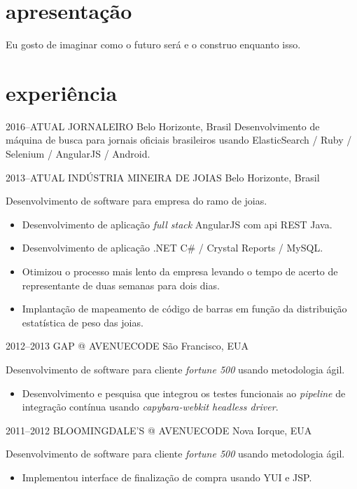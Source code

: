 \documentclass[]{friggeri-cv}
\begin{document}
\section{apresentação}
Eu gosto de imaginar como o futuro será e o construo enquanto isso.

\section{experiência}

\begin{entrylist}


\entry
{2016--ATUAL}
{JORNALEIRO}
{Belo Horizonte, Brasil}
{ Desenvolvimento de máquina de busca para jornais oficiais brasileiros usando ElasticSearch / Ruby / Selenium / AngularJS / Android.
}

\entry
{2013--ATUAL}
{INDÚSTRIA MINEIRA DE JOIAS}
{Belo Horizonte, Brasil}
{ Desenvolvimento de software para empresa do ramo de joias.

  \begin{itemize}
    \item Desenvolvimento de aplicação \textit{full stack} AngularJS com api REST Java.
    \item Desenvolvimento de aplicação .NET C\# / Crystal Reports / MySQL.
    \item Otimizou o processo mais lento da empresa levando o tempo de acerto de representante de duas semanas para dois dias.
    \item Implantação de mapeamento de código de barras em função da distribuição estatística de peso das joias.
  \end{itemize}
  }


\entry
{2012--2013}
{GAP @ AVENUECODE}
{São Francisco, EUA}
{ Desenvolvimento de software para cliente \textit{fortune 500} usando metodologia ágil.
  \begin{itemize}
    \item Desenvolvimento e pesquisa que integrou os testes funcionais ao \textit{pipeline} de integração contínua usando \textit{capybara-webkit headless driver}.
  \end{itemize}
}



\entry
{2011--2012}
{BLOOMINGDALE'S @ AVENUECODE}
{Nova Iorque, EUA}
{ Desenvolvimento de software para cliente \textit{fortune 500} usando metodologia ágil.

  \begin{itemize}
    \item Implementou interface de finalização de compra usando YUI e JSP.
  \end{itemize}
}



\end{entrylist}
\end{document}
